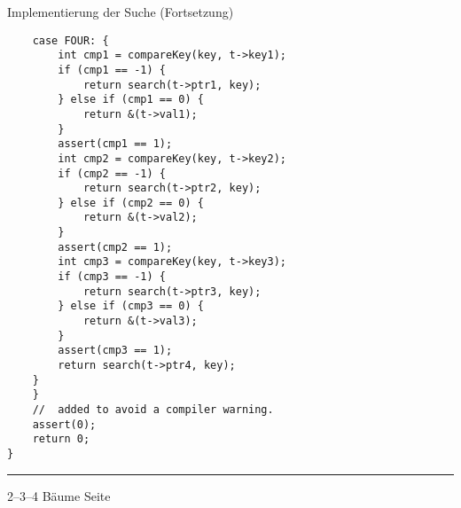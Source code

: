 \begin{slide}{}
\normalsize

\begin{center}
    Implementierung der Suche (Fortsetzung)
\end{center}
\vspace*{0.5cm}

\footnotesize
\begin{verbatim}
    case FOUR: {
        int cmp1 = compareKey(key, t->key1);
        if (cmp1 == -1) {
            return search(t->ptr1, key);
        } else if (cmp1 == 0) {
            return &(t->val1);
        } 
        assert(cmp1 == 1);
        int cmp2 = compareKey(key, t->key2);
        if (cmp2 == -1) {
            return search(t->ptr2, key);
        } else if (cmp2 == 0) {
            return &(t->val2);
        }
        assert(cmp2 == 1);
        int cmp3 = compareKey(key, t->key3);
        if (cmp3 == -1) {
            return search(t->ptr3, key);
        } else if (cmp3 == 0) {
            return &(t->val3);
        }
        assert(cmp3 == 1);
        return search(t->ptr4, key);
    }
    }
    //  added to avoid a compiler warning.
    assert(0);
    return 0;
}
\end{verbatim}

\vspace*{\fill}
\tiny \addtocounter{mypage}{1}
\rule{17cm}{1mm}
2--3--4 B\"aume  \hspace*{\fill} Seite 
\end{slide}


